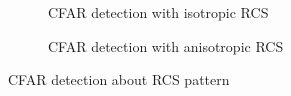 \documentclass[12pt,DIV14,BCOR12mm,a4paper,footinclude=false,headinclude,parskip=half-,twoside,openright,cleardoublepage=empty,toc=index,bibliography=totoc,listof=totoc]{scrreprt}
\numberwithin{equation}{chapter}
\begin{document}
\begin{figure}[t]
    \centering
    \begin{subfigure}{0.45\textwidth}
        \centering
        \caption{CFAR detection with isotropic RCS}
    \end{subfigure}\hspace{0.5cm}
    \begin{subfigure}{0.45\textwidth}
        \centering
        \caption{CFAR detection with anisotropic RCS}
    \end{subfigure}
    \caption{CFAR detection about RCS pattern}
    \label{cfar detection about rcs pattern}
\end{figure}
\end{document}
